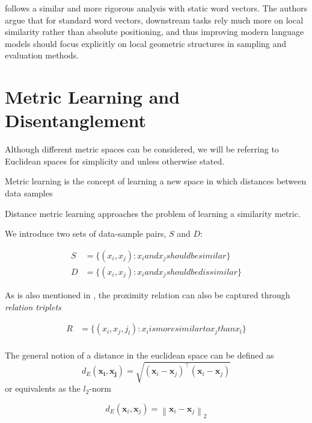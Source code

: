 \documentclass[a4paper,12pt,oneside,openright]{report}
\begin{document}
\cite{whitaker19} follows a similar and more rigorous analysis with static word vectors. 
The authors argue that for standard word vectors, downstream tasks rely much more on local similarity rather than absolute positioning, and thus improving modern language models should focus explicitly on local geometric structures in sampling and evaluation methods.

\section{Metric Learning and Disentanglement}
\label{appendix:metric_learning}

Although different metric spaces can be considered, we will be referring to Euclidean spaces for simplicity and unless otherwise stated.

Metric learning is the concept of learning a new space in which distances between data samples 

Distance metric learning approaches the problem of learning a similarity metric.

We introduce two sets of data-sample pairs, $S$ and $D$:

\begin{align}
S &= \{ (x_i, x_j) : x_i and x_j should be similar\} \\
D &= \{ (x_i, x_j) : x_i and x_j should be dissimilar\}
\end{align}

As is also mentioned in \cite{moutafis17}, the proximity relation can also be captured through \textit{relation triplets}

\begin{align}
R &= \{ (x_i, x_j, j_l) : x_i is more similar to x_j than x_l \} \\
\end{align}

The general notion of a distance in the euclidean space can be defined as 
\begin{equation}
d_{E}\left(\boldsymbol{x}_{\boldsymbol{i}}, \boldsymbol{x}_{\boldsymbol{j}}\right)=\sqrt{\left(\boldsymbol{x}_{i}-\boldsymbol{x}_{j}\right)^{\top}\left(\boldsymbol{x}_{i}-\boldsymbol{x}_{j}\right)}
\end{equation}
or equivalents as the $l_2$-norm

\begin{equation}
d_{E}\left(\boldsymbol{x}_{i}, \boldsymbol{x}_{j}\right)=\left\|\boldsymbol{x}_{i}-\boldsymbol{x}_{j}\right\|_{2}
\end{equation}
\end{document}
